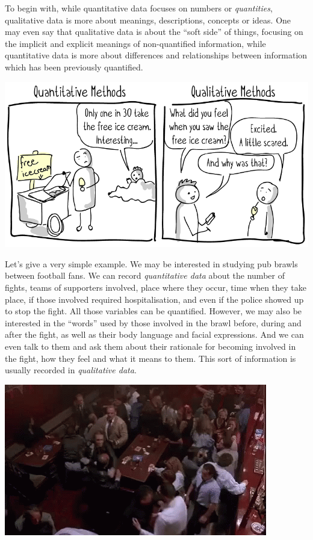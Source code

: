 \documentclass[
]{book}
\begin{document}
To begin with, while quantitative data focuses on numbers or \emph{quantities}, qualitative data is more about meanings, descriptions, concepts or ideas. One may even say that qualitative data is about the ``soft side'' of things, focusing on the implicit and explicit meanings of non-quantified information, while quantitative data is more about differences and relationships between information which has been previously quantified.

\includegraphics{imgs/quali_quanti.png}

Let's give a very simple example. We may be interested in studying pub brawls between football fans. We can record \emph{quantitative data} about the number of fights, teams of supporters involved, place where they occur, time when they take place, if those involved required hospitalisation, and even if the police showed up to stop the fight. All those variables can be quantified. However, we may also be interested in the ``words'' used by those involved in the brawl before, during and after the fight, as well as their body language and facial expressions. And we can even talk to them and ask them about their rationale for becoming involved in the fight, how they feel and what it means to them. This sort of information is usually recorded in \emph{qualitative data}.

\includegraphics{imgs/bar-brawl.gif}
\end{document}
